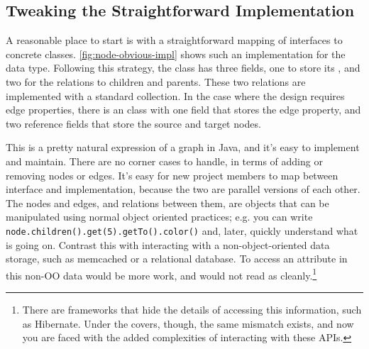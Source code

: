 
\subsection{Tweaking the Straightforward Implementation}
A reasonable place to start is with a straightforward mapping of interfaces to
concrete classes.
\autoref{fig:node-obvious-impl} shows such an implementation for the
 data type.
Following this strategy, the  class has three fields, one to store
its , and two for the relations to children and parents. These two
relations are implemented with a standard  collection. In the
case where the design requires edge properties, there is an  class
with one field that stores the edge property, and two reference fields that
store the source and target nodes.

This is a pretty natural expression of a graph in Java, and it's easy to
implement and maintain. There are no corner cases to handle, in terms of adding
or removing nodes or edges. It's easy for new project members to map between
interface and implementation, because the two are parallel versions of each
other. The nodes and edges, and relations between them, are objects that can be
manipulated using normal object oriented practices; e.g. you can write
\texttt{node.children().get(5).getTo()\-.color()} and, later, quickly
understand what is going on. Contrast this with interacting with a
non-object-oriented data storage, such as
memcached\cite{memcached} or a relational database. To access
an attribute in this non-OO data would be more work, and would not read as
cleanly.\footnote{There are frameworks that hide the details of accessing this
information, such as Hibernate\cite{hibernate}. Under the covers, though, the
same mismatch exists, and now you are faced with the added complexities of
interacting with these APIs.}


